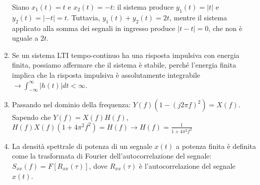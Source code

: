 \documentclass[12pt
]{article}
\begin{document}
\begin{enumerate}
	Siano 	\(x_1(t) = t\) e \(x_2(t) = -t\):  il sistema produce \(y_1(t) = |t|\)
	e \(y_2(t) = |-t| = t\). Tuttavia, \(y_1(t) + y_2(t) = 2t\), mentre il
	sistema applicato alla somma dei segnali in ingresso produce
	\(|t - t| = 0\), che non è uguale a \(2t\).
	\item
	Se un sistema LTI tempo-continuo ha una risposta impulsiva con energia
	finita, possiamo affermare che il sistema è stabile, perché l'energia 	finita implica che la risposta impulsiva è assolutamente integrabile $\to  \displaystyle \int_{-\infty}^\infty |h(t)| dt < \infty$. 
	\item
	Passando nel dominio della frequenza: \newline
	$\displaystyle Y(f)(1-(j2\pi f)^2)=X(f)$. Sapendo che $Y(f)=X(f)H(f)$, \newline
	$\displaystyle H(f)X(f)(1+4\pi^2 f^2)=H(f) \to H(f)=\frac{1}{1+4\pi^2 f^2}$
	\item
	La densità spettrale di potenza di un segnale \(x(t)\) a potenza
	finita è definita come la trasformata di Fourier dell'autocorrelazione
	del segnale: \(S_{xx}(f) = F[R_{xx}(\tau)]\), dove \(R_{xx}(\tau)\) è
	l'autocorrelazione del segnale \(x(t)\).
\end{enumerate}
\end{document}
